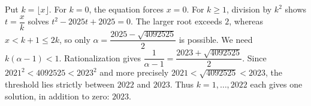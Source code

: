Put $k=\lfloor x\rfloor$. For $k=0$, the equation forces $x=0$. For $k\ge1$, division by $k^2$ shows $t=\dfrac{x}{k}$ solves $t^2-2025t+2025=0$. The larger root exceeds $2$, whereas $x<k+1\le2k$, so only $\alpha=\dfrac{2025-\sqrt{4092525}}{2}$ is possible. We need $k(\alpha-1)<1$. Rationalization gives $\dfrac{1}{\alpha-1}=\dfrac{2023+\sqrt{4092525}}{2}$. Since $2021^2<4092525<2023^2$ and more precisely $2021<\sqrt{4092525}<2023$, the threshold lies strictly between $2022$ and $2023$. Thus $k=1,\ldots,2022$ each gives one solution, in addition to zero: $\boxed{2023}$.
